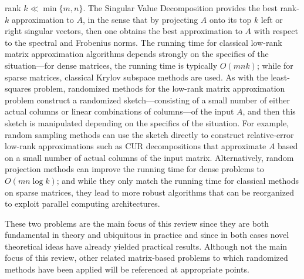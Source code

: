 \documentclass[twoside]{article}
\begin{document}
\begin{itemize}
rank $k \ll \min\{m,n\}$.
The Singular Value Decomposition provides the best rank-$k$ approximation 
to $A$, in the sense that by projecting $A$ onto its top $k$ left or right 
singular vectors, then one obtains the best approximation to $A$ with 
respect to the spectral and Frobenius norms.
The running time for classical low-rank matrix approximation algorithms 
depends strongly on the specifics of the situation---for dense matrices, the 
running time is typically $O(mnk)$; while for sparse matrices, classical 
Krylov subspace methods are used.
As with the least-squares problem, randomized methods for the low-rank matrix
approximation problem construct a randomized sketch---consisting of a small 
number of either actual columns or linear combinations of columns---of the 
input $A$, and then this sketch is manipulated depending on the specifics of 
the situation.
For example, random sampling methods can use the sketch directly to 
construct relative-error low-rank approximations such as CUR decompositions 
that approximate $A$ based on a small number of actual columns of the input 
matrix.
Alternatively, random projection methods can improve the running time for 
dense problems to $O(mn \log k)$; and while they only match the running time 
for classical methods on sparse matrices, they lead to more robust 
algorithms that can be reorganized to exploit parallel computing 
architectures.
\end{itemize}
These two problems are the main focus of this review since they are both 
fundamental in theory and ubiquitous in practice and since in both cases
novel theoretical ideas have already yielded practical results.
Although not the main focus of this review, other related matrix-based 
problems to which randomized methods have been applied will be referenced 
at appropriate points.
\end{document}
